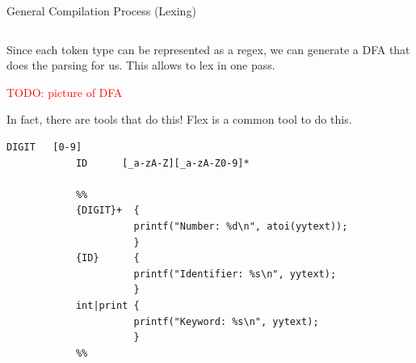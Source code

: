 \documentclass{beamer}
\newcommand{\todo}[1]{\textcolor{red}{TODO: #1}}
\begin{document}
\begin{frame}[fragile]{General Compilation Process (Lexing)}
\begin{columns}[T,onlytextwidth]
        \begin{overprint}
            Since each token type can be represented as a regex, we can generate a DFA that does the parsing for us. This allows to lex in one pass.

            \todo{picture of DFA}

            In fact, there are tools that do this! Flex is a common tool to do this.

            \begin{lstlisting}[gobble=12,escapeinside=~]
            DIGIT   [0-9]
            ID      [_a-zA-Z][_a-zA-Z0-9]*

            %%
            {DIGIT}+  {
                      printf("Number: %d\n", atoi(yytext));
                      }
            {ID}      {
                      printf("Identifier: %s\n", yytext);
                      }
            int|print {
                      printf("Keyword: %s\n", yytext);
                      }
            %%
            \end{lstlisting}
        \end{overprint}

\end{columns}
\end{frame}
\end{document}

